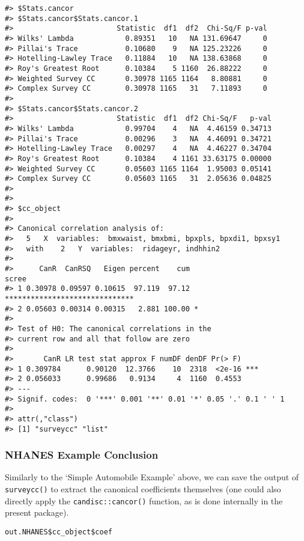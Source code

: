 \begin{verbatim}
#> $Stats.cancor
#> $Stats.cancor$Stats.cancor.1
#>                        Statistic  df1  df2  Chi-Sq/F p-val
#> Wilks' Lambda            0.89351   10   NA 131.69647     0
#> Pillai's Trace           0.10680    9   NA 125.23226     0
#> Hotelling-Lawley Trace   0.11884   10   NA 138.63868     0
#> Roy's Greatest Root      0.10384    5 1160  26.88222     0
#> Weighted Survey CC       0.30978 1165 1164   8.80881     0
#> Complex Survey CC        0.30978 1165   31   7.11893     0
#> 
#> $Stats.cancor$Stats.cancor.2
#>                        Statistic  df1  df2 Chi-Sq/F   p-val
#> Wilks' Lambda            0.99704    4   NA  4.46159 0.34713
#> Pillai's Trace           0.00296    3   NA  4.46091 0.34721
#> Hotelling-Lawley Trace   0.00297    4   NA  4.46227 0.34704
#> Roy's Greatest Root      0.10384    4 1161 33.63175 0.00000
#> Weighted Survey CC       0.05603 1165 1164  1.95003 0.05141
#> Complex Survey CC        0.05603 1165   31  2.05636 0.04825
#> 
#> 
#> $cc_object
#> 
#> Canonical correlation analysis of:
#>   5   X  variables:  bmxwaist, bmxbmi, bpxpls, bpxdi1, bpxsy1 
#>   with    2   Y  variables:  ridageyr, indhhin2 
#> 
#>      CanR  CanRSQ   Eigen percent    cum                          scree
#> 1 0.30978 0.09597 0.10615  97.119  97.12 ******************************
#> 2 0.05603 0.00314 0.00315   2.881 100.00 *                             
#> 
#> Test of H0: The canonical correlations in the 
#> current row and all that follow are zero
#> 
#>       CanR LR test stat approx F numDF denDF Pr(> F)    
#> 1 0.309784      0.90120  12.3766    10  2318  <2e-16 ***
#> 2 0.056033      0.99686   0.9134     4  1160  0.4553    
#> ---
#> Signif. codes:  0 '***' 0.001 '**' 0.01 '*' 0.05 '.' 0.1 ' ' 1
#> 
#> attr(,"class")
#> [1] "surveycc" "list"
\end{verbatim}

\hypertarget{nhanes-example-conclusion}{%
\subsubsection{NHANES Example Conclusion}\label{nhanes-example-conclusion}}

Similarly to the `Simple Automobile Example' above, we can save the output of \texttt{surveycc()} to extract the canonical coefficients themselves (one could also directly apply the \texttt{candisc::cancor()} function, as is done internally in the present package).

\begin{verbatim}
out.NHANES$cc_object$coef
\end{verbatim}

